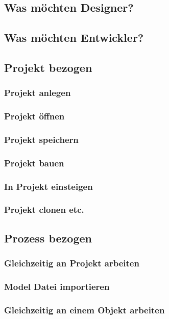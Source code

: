 \documentclass[pagesize, paper=a4, fontsize=12pt,titlepage=true, headings=small, headnosepline, abstractoff, liststotoc, nochapterprefix, plainheadsepline, twoside]{scrreprt}
\begin{document}
\subsection{Was möchten Designer?}
\subsection{Was möchten Entwickler?}

\subsection{Projekt bezogen}
\subsubsection{Projekt anlegen}
\subsubsection{Projekt öffnen}
\subsubsection{Projekt speichern}
\subsubsection{Projekt bauen}
\subsubsection{In Projekt einsteigen}
\subsubsection{Projekt clonen etc.}

\subsection{Prozess bezogen}
\subsubsection{Gleichzeitig an Projekt arbeiten}
\subsubsection{Model Datei importieren}
\subsubsection{Gleichzeitig an einem Objekt arbeiten}
\end{document}
